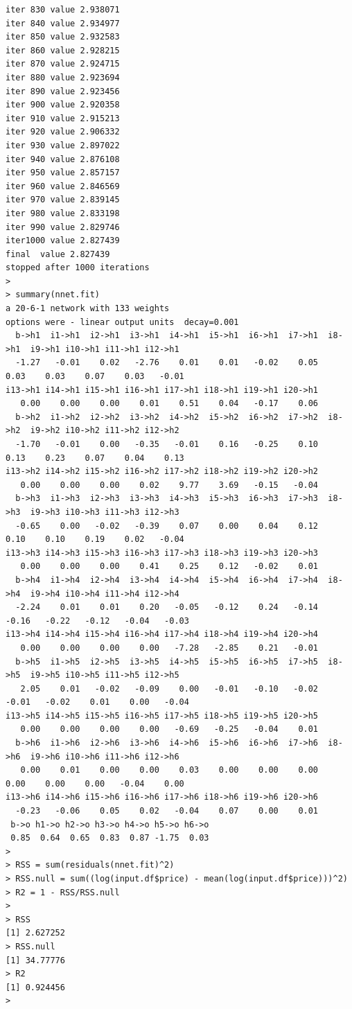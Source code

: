 \documentclass{article}%
\begin{document}
\begin{verbatim}
iter 830 value 2.938071
iter 840 value 2.934977
iter 850 value 2.932583
iter 860 value 2.928215
iter 870 value 2.924715
iter 880 value 2.923694
iter 890 value 2.923456
iter 900 value 2.920358
iter 910 value 2.915213
iter 920 value 2.906332
iter 930 value 2.897022
iter 940 value 2.876108
iter 950 value 2.857157
iter 960 value 2.846569
iter 970 value 2.839145
iter 980 value 2.833198
iter 990 value 2.829746
iter1000 value 2.827439
final  value 2.827439 
stopped after 1000 iterations
> 
> summary(nnet.fit)
a 20-6-1 network with 133 weights
options were - linear output units  decay=0.001
  b->h1  i1->h1  i2->h1  i3->h1  i4->h1  i5->h1  i6->h1  i7->h1  i8->h1  i9->h1 i10->h1 i11->h1 i12->h1 
  -1.27   -0.01    0.02   -2.76    0.01    0.01   -0.02    0.05    0.03    0.03    0.07    0.03   -0.01 
i13->h1 i14->h1 i15->h1 i16->h1 i17->h1 i18->h1 i19->h1 i20->h1 
   0.00    0.00    0.00    0.01    0.51    0.04   -0.17    0.06 
  b->h2  i1->h2  i2->h2  i3->h2  i4->h2  i5->h2  i6->h2  i7->h2  i8->h2  i9->h2 i10->h2 i11->h2 i12->h2 
  -1.70   -0.01    0.00   -0.35   -0.01    0.16   -0.25    0.10    0.13    0.23    0.07    0.04    0.13 
i13->h2 i14->h2 i15->h2 i16->h2 i17->h2 i18->h2 i19->h2 i20->h2 
   0.00    0.00    0.00    0.02    9.77    3.69   -0.15   -0.04 
  b->h3  i1->h3  i2->h3  i3->h3  i4->h3  i5->h3  i6->h3  i7->h3  i8->h3  i9->h3 i10->h3 i11->h3 i12->h3 
  -0.65    0.00   -0.02   -0.39    0.07    0.00    0.04    0.12    0.10    0.10    0.19    0.02   -0.04 
i13->h3 i14->h3 i15->h3 i16->h3 i17->h3 i18->h3 i19->h3 i20->h3 
   0.00    0.00    0.00    0.41    0.25    0.12   -0.02    0.01 
  b->h4  i1->h4  i2->h4  i3->h4  i4->h4  i5->h4  i6->h4  i7->h4  i8->h4  i9->h4 i10->h4 i11->h4 i12->h4 
  -2.24    0.01    0.01    0.20   -0.05   -0.12    0.24   -0.14   -0.16   -0.22   -0.12   -0.04   -0.03 
i13->h4 i14->h4 i15->h4 i16->h4 i17->h4 i18->h4 i19->h4 i20->h4 
   0.00    0.00    0.00    0.00   -7.28   -2.85    0.21   -0.01 
  b->h5  i1->h5  i2->h5  i3->h5  i4->h5  i5->h5  i6->h5  i7->h5  i8->h5  i9->h5 i10->h5 i11->h5 i12->h5 
   2.05    0.01   -0.02   -0.09    0.00   -0.01   -0.10   -0.02   -0.01   -0.02    0.01    0.00   -0.04 
i13->h5 i14->h5 i15->h5 i16->h5 i17->h5 i18->h5 i19->h5 i20->h5 
   0.00    0.00    0.00    0.00   -0.69   -0.25   -0.04    0.01 
  b->h6  i1->h6  i2->h6  i3->h6  i4->h6  i5->h6  i6->h6  i7->h6  i8->h6  i9->h6 i10->h6 i11->h6 i12->h6 
   0.00    0.01    0.00    0.00    0.03    0.00    0.00    0.00    0.00    0.00    0.00   -0.04    0.00 
i13->h6 i14->h6 i15->h6 i16->h6 i17->h6 i18->h6 i19->h6 i20->h6 
  -0.23   -0.06    0.05    0.02   -0.04    0.07    0.00    0.01 
 b->o h1->o h2->o h3->o h4->o h5->o h6->o 
 0.85  0.64  0.65  0.83  0.87 -1.75  0.03 
> 
> RSS = sum(residuals(nnet.fit)^2)
> RSS.null = sum((log(input.df$price) - mean(log(input.df$price)))^2)
> R2 = 1 - RSS/RSS.null
> 
> RSS
[1] 2.627252
> RSS.null
[1] 34.77776
> R2
[1] 0.924456
> 
\end{verbatim}
\end{document}
